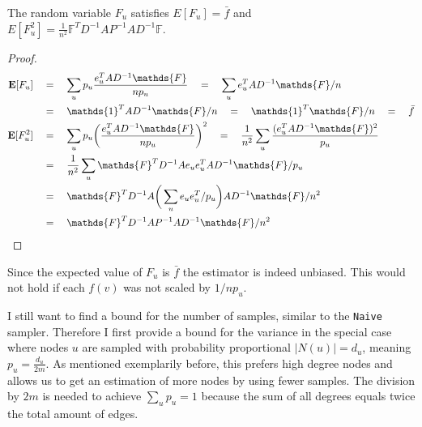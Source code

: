 \begin{lemma}
\label{lemmafu}
  The random variable $F_u$ satisfies $E[F_u] = \bar{f}$ and \\
  $E[F_u^2] = \frac{1}{n^2}\mathds{F}^TD^{-1}AP^{-1}AD^{-1}\mathds{F}$.
\end{lemma}
\begin{proof}
\begin{align*}
\textbf{E}[F_u] \quad&=\quad \sum_u p_u \frac{e_u^TAD^{-1}\mathds{F}}{np_u} \quad=\quad \sum_u e_u^TAD^{-1}\mathds{F}/n \\
&=\quad\mathds{1}^TAD^{-1}\mathds{F}/n \quad=\quad \mathds{1}^T\mathds{F}/n \quad=\quad \bar{f} \\
\textbf{E}[F_u^2] \quad&=\quad \sum_u p_u \bigg(\frac{e_u^TAD^{-1}\mathds{F}}{np_u}\bigg)^2 \quad=\quad \frac{1}{n^2}\sum_u \frac{(e_u^TAD^{-1}\mathds{F})^2}{p_u} \\
&=\quad\frac{1}{n^2}\sum_u \mathds{F}^TD^{-1}Ae_ue_u^TAD^{-1}\mathds{F}/p_u \\
&=\quad \mathds{F}^TD^{-1}A\bigg(\sum_ue_ue_u^T/p_u\bigg)AD^{-1}\mathds{F}/n^2 \\
&=\quad \mathds{F}^TD^{-1}AP^{-1}AD^{-1}\mathds{F}/n^2 \qedhere
\end{align*}
\end{proof}
Since the expected value of $F_u$ is $\bar{f}$ the estimator is indeed unbiased.
This would not hold if each $f(v)$ was not scaled by $1/{np_u}$.

I still want to find a bound for the number of samples, similar to the \texttt{Naive} sampler.
Therefore I first provide a bound for the variance in the special case where nodes $u$ are sampled with probability proportional $|N(u)| = d_u$, meaning $p_u = \frac{d_u}{2m}$. As mentioned exemplarily before, this prefers high degree nodes and allows us to get an estimation of more nodes by using fewer samples. The division by $2m$ is needed to achieve $\sum_u{p_u} = 1$ because the sum of all degrees equals twice the total amount of edges.

